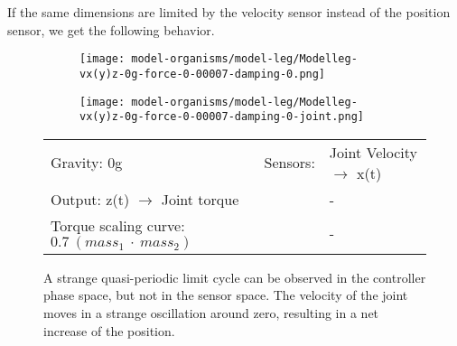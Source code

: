 \documentclass[main]{subfiles}
\begin{document}
If the same dimensions are limited by the velocity sensor instead of the position sensor, we get the following behavior.

\begin{figure}[H]
	\centering
		\begin{subfigure}[c]{0.45\textwidth}
	\texttt{[image: model-organisms/model-leg/Modelleg-vx(y)z-0g-force-0-00007-damping-0.png]}
		\end{subfigure}
	\begin{subfigure}[c]{0.45\textwidth}
	\texttt{[image: model-organisms/model-leg/Modelleg-vx(y)z-0g-force-0-00007-damping-0-joint.png]}
		\end{subfigure}
	\caption[Joint Velocity \(\rightarrow\) x(t) limited chaotic controller controlling model leg]{A strange quasi-periodic limit cycle can be observed in the controller phase space, but not in the sensor space. The velocity of the joint moves in a strange oscillation around zero, resulting in a net increase of the position.}
	\begin{tabular}{l|ll}
	\hline 
	Gravity: 0g  & Sensors: & Joint Velocity \(\rightarrow\) x(t)\\
	 Output: z(t) \(\rightarrow\) Joint torque & & - \\
	  Torque scaling curve: \(0.7~(mass_1~\cdot~mass_2)\) & & - \\
	  \hline
	\end{tabular}
	\label{figure:limited-model-leg3}
\end{figure}
\end{document}
